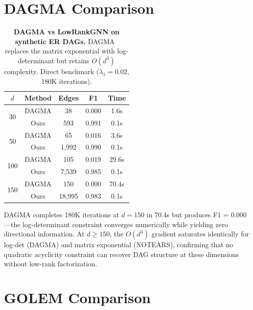 \documentclass{article}
\theoremstyle{definition}
\begin{document}
\section{DAGMA Comparison}
\label{app:dagma}

\begin{table}[H]
\centering
\caption{\textbf{DAGMA vs LowRankGNN on synthetic ER DAGs.} DAGMA~\citep{bello2022dagma} replaces the matrix exponential with log-determinant but retains $O(d^3)$ complexity. Direct benchmark ($\lambda_1=0.02$, 180K iterations).}
\label{tab:dagma}
\small
\begin{tabular}{ccccc}
\toprule
$d$ & Method & Edges & F1 & Time \\
\midrule
\multirow{2}{*}{30} & DAGMA & 38 & 0.000 & 1.6s \\
& Ours & 593 & 0.991 & 0.1s \\
\midrule
\multirow{2}{*}{50} & DAGMA & 65 & 0.016 & 3.6s \\
& Ours & 1,992 & 0.990 & 0.1s \\
\midrule
\multirow{2}{*}{100} & DAGMA & 105 & 0.019 & 29.6s \\
& Ours & 7,539 & 0.985 & 0.1s \\
\midrule
\multirow{2}{*}{150} & DAGMA & 150 & 0.000 & 70.4s \\
& Ours & 18,995 & 0.983 & 0.1s \\
\bottomrule
\end{tabular}

DAGMA completes 180K iterations at $d=150$ in 70.4s but produces F1 = 0.000---the log-determinant constraint converges numerically while yielding zero directional information. At $d \ge 150$, the $O(d^3)$ gradient saturates identically for log-det (DAGMA) and matrix exponential (NOTEARS), confirming that no quadratic acyclicity constraint can recover DAG structure at these dimensions without low-rank factorization.

\section{GOLEM Comparison}
\label{app:golem}


\end{table}
\end{document}
